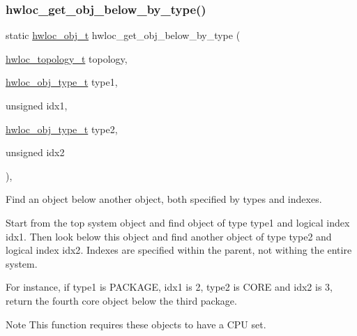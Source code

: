 \subsubsection{\texorpdfstring{hwloc\+\_\+get\+\_\+obj\+\_\+below\+\_\+by\+\_\+type()}{hwloc\_get\_obj\_below\_by\_type()}}
{\footnotesize\ttfamily static \hyperlink{a00185_ga79b8ab56877ef99ac59b833203391c7d}{hwloc\+\_\+obj\+\_\+t} hwloc\+\_\+get\+\_\+obj\+\_\+below\+\_\+by\+\_\+type (\begin{DoxyParamCaption}\item[{\hyperlink{a00186_ga9d1e76ee15a7dee158b786c30b6a6e38}{hwloc\+\_\+topology\+\_\+t}}]{topology,  }\item[{\hyperlink{a00184_gacd37bb612667dc437d66bfb175a8dc55}{hwloc\+\_\+obj\+\_\+type\+\_\+t}}]{type1,  }\item[{unsigned}]{idx1,  }\item[{\hyperlink{a00184_gacd37bb612667dc437d66bfb175a8dc55}{hwloc\+\_\+obj\+\_\+type\+\_\+t}}]{type2,  }\item[{unsigned}]{idx2 }\end{DoxyParamCaption})\hspace{0.3cm}{\ttfamily [inline]}, {\ttfamily [static]}}



Find an object below another object, both specified by types and indexes. 

Start from the top system object and find object of type {\ttfamily type1} and logical index {\ttfamily idx1}. Then look below this object and find another object of type {\ttfamily type2} and logical index {\ttfamily idx2}. Indexes are specified within the parent, not withing the entire system.

For instance, if type1 is P\+A\+C\+K\+A\+GE, idx1 is 2, type2 is C\+O\+RE and idx2 is 3, return the fourth core object below the third package.

\begin{DoxyNote}{Note}
This function requires these objects to have a C\+PU set. 
\end{DoxyNote}
\mbox{\label{a00200_ga751c238a4931db5cc0ca3181b7dd7479}} 
